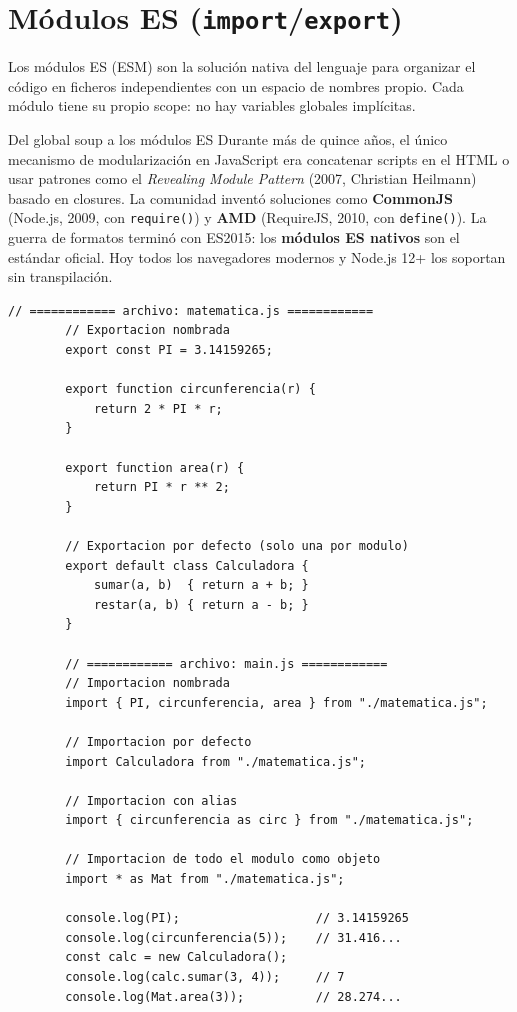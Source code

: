 \documentclass[11pt,a4paper,openany]{book}
\begin{document}
	\section{Módulos ES (\texttt{import}/\texttt{export})}
	\label{sec:4.modulos}
	
	Los módulos ES (ESM) son la solución nativa del lenguaje para
	organizar el código en ficheros independientes con un
	espacio de nombres propio. Cada módulo tiene su propio scope:
	no hay variables globales implícitas.
	
	\begin{cajahistoria}{Del global soup a los módulos ES}
		Durante más de quince años, el único mecanismo de modularización
		en JavaScript era concatenar scripts en el HTML o usar patrones
		como el \emph{Revealing Module Pattern} (2007, Christian Heilmann)
		basado en closures. La comunidad inventó soluciones como
		\textbf{CommonJS} (Node.js, 2009, con \texttt{require()}) y
		\textbf{AMD} (RequireJS, 2010, con \texttt{define()}). La guerra
		de formatos terminó con ES2015: los \textbf{módulos ES nativos}
		son el estándar oficial. Hoy todos los navegadores modernos y
		Node.js 12+ los soportan sin transpilación.
	\end{cajahistoria}
	
	\begin{lstlisting}[style=js,caption={Módulos ES: export e import},label=lst:4.19]
		// ============ archivo: matematica.js ============
		// Exportacion nombrada
		export const PI = 3.14159265;
		
		export function circunferencia(r) {
			return 2 * PI * r;
		}
		
		export function area(r) {
			return PI * r ** 2;
		}
		
		// Exportacion por defecto (solo una por modulo)
		export default class Calculadora {
			sumar(a, b)  { return a + b; }
			restar(a, b) { return a - b; }
		}
		
		// ============ archivo: main.js ============
		// Importacion nombrada
		import { PI, circunferencia, area } from "./matematica.js";
		
		// Importacion por defecto
		import Calculadora from "./matematica.js";
		
		// Importacion con alias
		import { circunferencia as circ } from "./matematica.js";
		
		// Importacion de todo el modulo como objeto
		import * as Mat from "./matematica.js";
		
		console.log(PI);                   // 3.14159265
		console.log(circunferencia(5));    // 31.416...
		const calc = new Calculadora();
		console.log(calc.sumar(3, 4));     // 7
		console.log(Mat.area(3));          // 28.274...
	\end{lstlisting}
	
\end{document}
